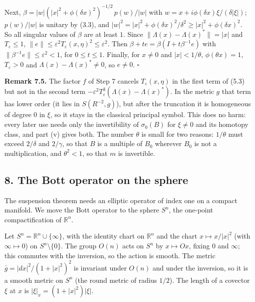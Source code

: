 \documentclass[
  11pt,
]{article}
\begin{document}
Next, \(\beta=|w|(|x|^2+\phi(\delta x)^2)^{-1/2}\,p(w)/|w|\) with
\(w=x+i\phi(\delta x)\xi/(\delta|\xi|)\); \(p(w)/|w|\) is unitary by
(3.3), and
\(|w|^2=|x|^2+\phi(\delta x)^2/\delta^2\ge|x|^2+\phi(\delta x)^2\). So
all singular values of \(\beta\) are at least \(1\). Since
\(\|\Lambda(x)-\Lambda(x)^*\|=|x|\) and \(T_\varepsilon\le1\),
\(\|e\|\le\varepsilon^2T_\varepsilon(x,\eta)^2\le\varepsilon^2\). Then
\(\beta+te=\beta(I+t\beta^{-1}e)\) with
\(\|\beta^{-1}e\|\le\varepsilon^2<1\), for \(0\le t\le1\). Finally, for
\(x\ne0\) and \(|x|<1/\theta\), \(\phi(\theta x)=1\),
\(T_\varepsilon>0\) and \(\Lambda(x)-\Lambda(x)^*\ne0\), so \(e\ne0\).
\(\square\)

\textbf{Remark 7.5.} The factor \(f\) of Step 7 cancels
\(T_\varepsilon(x,\eta)\) in the first term of (5.3) but not in the
second term \(-\varepsilon^2T_\varepsilon^3(\Lambda(x)-\Lambda(x)^*)\).
In the metric \(g\) that term has lower order (it lies in
\(S(R^{-2},g)\)), but after the truncation it is homogeneous of degree
\(0\) in \(\xi\), so it stays in the classical principal symbol. This
does no harm: every later use needs only the invertibility of
\(\sigma_0(B)\) for \(\xi\ne0\) and its homotopy class, and part (v)
gives both. The number \(\theta\) is small for two reasons: \(1/\theta\)
must exceed \(2/\delta\) and \(2/\gamma\), so that \(B\) is a multiple
of \(B_0\) wherever \(B_0\) is not a multiplication, and \(\theta^2<1\),
so that \(m\) is invertible.

\subsection{8. The Bott operator on the
sphere}\label{the-bott-operator-on-the-sphere}

The suspension theorem needs an elliptic operator of index one on a
compact manifold. We move the Bott operator to the sphere \(S^n\), the
one-point compactification of \(\mathbb R^n\).

Let \(S^n=\mathbb R^n\cup\{\infty\}\), with the identity chart on
\(\mathbb R^n\) and the chart \(x\mapsto x/|x|^2\) (with
\(\infty\mapsto0\)) on \(S^n\setminus\{0\}\). The group \(O(n)\) acts on
\(S^n\) by \(x\mapsto Ox\), fixing \(0\) and \(\infty\); this commutes
with the inversion, so the action is smooth. The metric
\(\bar g=|dx|^2/(1+|x|^2)^2\) is invariant under \(O(n)\) and under the
inversion, so it is a smooth metric on \(S^n\) (the round metric of
radius \(1/2\)). The length of a covector \(\xi\) at \(x\) is
\(|\xi|_x=(1+|x|^2)|\xi|\).
\end{document}
